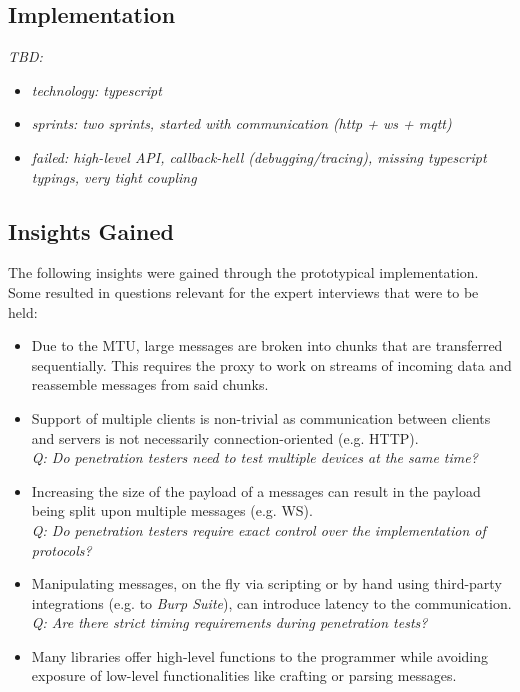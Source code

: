 \subsection{Implementation}
\emph{TBD:}  %
\begin{itemize}
    \item \emph{technology: typescript}
    \item \emph{sprints: two sprints, started with communication (http + ws + mqtt)}
    \item \emph{failed: high-level API, callback-hell (debugging/tracing), missing typescript typings, very tight coupling}
\end{itemize}

\subsection{Insights Gained}
The following insights were gained through the prototypical implementation. Some resulted in questions relevant for the expert interviews that were to be held:
\begin{itemize}
    \item Due to the \ac{MTU}, large messages are broken into chunks that are transferred sequentially. This requires the proxy to work on streams of incoming data and reassemble messages from said chunks. %
    \item Support of multiple clients is non-trivial as communication between clients and servers is not necessarily connection-oriented (e.g. \ac{HTTP}).\\
          \emph{Q: Do penetration testers need to test multiple devices at the same time?}
    \item Increasing the size of the payload of a messages can result in the payload being split upon multiple messages (e.g. \ac{WS}).\\
          \emph{Q: Do penetration testers require exact control over the implementation of protocols?}
    \item Manipulating messages, on the fly via scripting or by hand using third-party integrations (e.g. to \emph{Burp Suite}), can introduce latency to the communication. \emph{Q: Are there strict timing requirements during penetration tests?}
    \item Many libraries offer high-level functions to the programmer while avoiding exposure of low-level functionalities like crafting or parsing messages.
\end{itemize}



